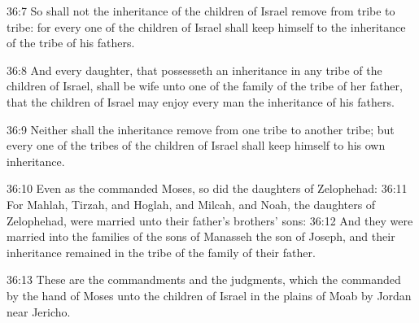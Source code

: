36:7 So shall not the inheritance of the children of Israel remove from tribe to tribe: for every one of the children of Israel shall keep himself to the inheritance of the tribe of his fathers.

36:8 And every daughter, that possesseth an inheritance in any tribe of the children of Israel, shall be wife unto one of the family of the tribe of her father, that the children of Israel may enjoy every man the inheritance of his fathers.

36:9 Neither shall the inheritance remove from one tribe to another tribe; but every one of the tribes of the children of Israel shall keep himself to his own inheritance.

36:10 Even as the \LORD commanded Moses, so did the daughters of Zelophehad: 36:11 For Mahlah, Tirzah, and Hoglah, and Milcah, and Noah, the daughters of Zelophehad, were married unto their father's brothers' sons: 36:12 And they were married into the families of the sons of Manasseh the son of Joseph, and their inheritance remained in the tribe of the family of their father.

36:13 These are the commandments and the judgments, which the \LORD commanded by the hand of Moses unto the children of Israel in the plains of Moab by Jordan near Jericho.

